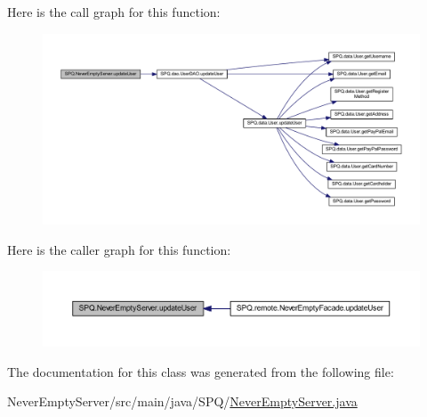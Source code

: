 Here is the call graph for this function\+:
\nopagebreak
\begin{figure}[H]
\begin{center}
\leavevmode
\includegraphics[width=350pt]{class_s_p_q_1_1_never_empty_server_ad39f95ea2309841407f7e8b9e1b9f664_cgraph}
\end{center}
\end{figure}
Here is the caller graph for this function\+:
\nopagebreak
\begin{figure}[H]
\begin{center}
\leavevmode
\includegraphics[width=350pt]{class_s_p_q_1_1_never_empty_server_ad39f95ea2309841407f7e8b9e1b9f664_icgraph}
\end{center}
\end{figure}


The documentation for this class was generated from the following file\+:\begin{DoxyCompactItemize}
\item 
Never\+Empty\+Server/src/main/java/\+S\+P\+Q/\mbox{\hyperlink{_never_empty_server_8java}{Never\+Empty\+Server.\+java}}\end{DoxyCompactItemize}
